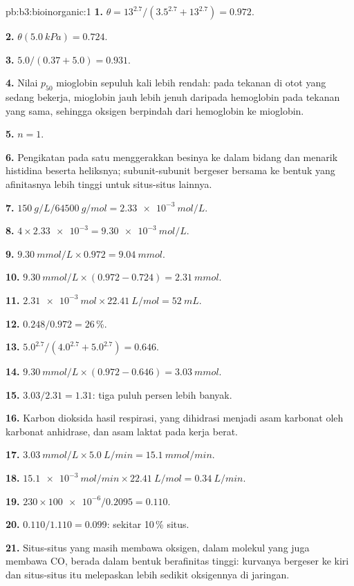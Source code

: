 \begin{solution}{pb:b3:bioinorganic:1}
\textbf{1.} $\theta = 13^{2.7}/(3.5^{2.7} + 13^{2.7}) = 0.972$.

\textbf{2.} $\theta(\qty{5.0}{kPa}) = 0.724$.

\textbf{3.} $5.0/(0.37 + 5.0) = 0.931$.

\textbf{4.} Nilai $p_{50}$ mioglobin sepuluh kali lebih rendah: pada tekanan di otot yang sedang bekerja, mioglobin jauh lebih
jenuh daripada hemoglobin pada tekanan yang sama, sehingga oksigen berpindah dari
hemoglobin ke mioglobin.

\textbf{5.} $n = 1$.

\textbf{6.} Pengikatan pada satu  menggerakkan besinya ke dalam bidang dan menarik histidina beserta
heliksnya; subunit-subunit bergeser bersama ke bentuk yang afinitasnya lebih tinggi untuk
situs-situs lainnya.

\textbf{7.} $\qty{150}{g/L}/\qty{64500}{g/mol} = \qty{2.33e-3}{mol/L}$.

\textbf{8.} $4 \times \num{2.33e-3} = \qty{9.30e-3}{mol/L}$.

\textbf{9.} $\qty{9.30}{mmol/L} \times 0.972 = \qty{9.04}{mmol}$.

\textbf{10.} $\qty{9.30}{mmol/L} \times (0.972 - 0.724) = \qty{2.31}{mmol}$.

\textbf{11.} $\qty{2.31e-3}{mol} \times \qty{22.41}{L/mol} = \qty{52}{mL}$.

\textbf{12.} $0.248/0.972 = 26$\,\%.

\textbf{13.} $5.0^{2.7}/(4.0^{2.7} + 5.0^{2.7}) = 0.646$.

\textbf{14.} $\qty{9.30}{mmol/L} \times (0.972 - 0.646) = \qty{3.03}{mmol}$.

\textbf{15.} $3.03/2.31 = 1.31$: tiga puluh persen lebih banyak.

\textbf{16.} Karbon dioksida hasil respirasi, yang dihidrasi menjadi asam karbonat oleh
karbonat anhidrase, dan asam laktat pada kerja berat.

\textbf{17.} $\qty{3.03}{mmol/L} \times \qty{5.0}{L/min} = \qty{15.1}{mmol/min}$.

\textbf{18.} $\qty{15.1e-3}{mol/min} \times \qty{22.41}{L/mol} = \qty{0.34}{L/min}$.

\textbf{19.} $230 \times \num{100e-6}/0.2095 = 0.110$.

\textbf{20.} $0.110/1.110 = 0.099$: sekitar 10\,\% situs.

\textbf{21.} Situs-situs yang masih membawa oksigen, dalam molekul yang juga membawa CO, berada dalam
bentuk berafinitas tinggi: kurvanya bergeser ke kiri dan situs-situs itu melepaskan lebih sedikit
oksigennya di jaringan.


\end{solution}
